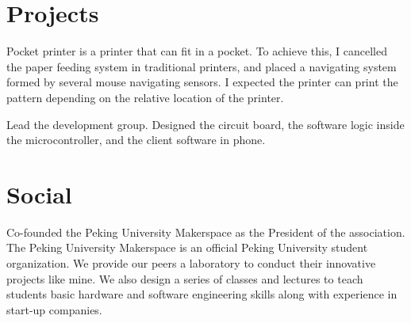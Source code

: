 \documentclass[]{deedy-resume-openfont}
\begin{document}
\begin{minipage}[t]{0.62\textwidth}

\section{Projects}
\descript{}
Pocket printer is a printer that can fit in a pocket. To achieve this, I cancelled the paper feeding system in traditional printers, and placed a navigating system formed by several mouse navigating sensors. I expected the printer can print the pattern depending on the relative location of the printer. 

Lead the development group. Designed the circuit board, the software logic inside the microcontroller, and the client software in phone.
\sectionsep


\section{Social}
Co-founded the Peking University Makerspace as the President of the association. The Peking University Makerspace is an official Peking University student organization. We provide our peers a laboratory to conduct their innovative projects like mine. We also design a series of classes and lectures to teach students basic hardware and software engineering skills along with experience in start-up companies.





\end{minipage} 
\end{document}
